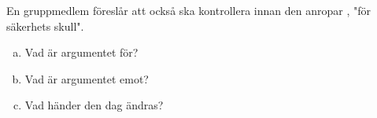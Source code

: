 \label{ex:5:5}
En gruppmedlem föreslår att också  ska kontrollera  innan den anropar
, "för säkerhets skull".
\begin{enumerate}[a)]
  \item Vad är argumentet för?
  \item Vad är argumentet emot?
  \item Vad händer den dag  ändras?
\end{enumerate}

